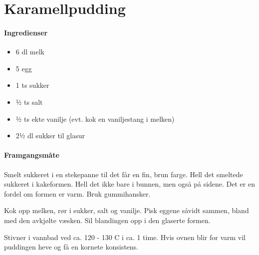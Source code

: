 \section{Karamellpudding}

\paragraph{Ingredienser}
\begin{itemize}[noitemsep]
	\item 6 dl melk
	\item 5 egg
	\item 1 ts sukker
	\item ½ ts salt
	\item ½ ts ekte vanilje (evt. kok en vaniljestang i melken)
	\item 2½ dl sukker til glasur
\end{itemize}

\paragraph{Framgangsmåte}
Smelt sukkeret i en stekepanne til det får en fin, brun farge. Hell det smeltede sukkeret i kakeformen. Hell det ikke bare i bunnen, men også på sidene. Det er en fordel om formen er varm. Bruk gummihansker.

Kok opp melken, rør i sukker, salt og vanilje. Pisk eggene såvidt sammen, bland med den avkjølte væsken. Sil blandingen opp i den glaserte formen.

Stivner i vannbad ved ca. 120 - 130 \textdegree{}C i ca. 1 time.
Hvis ovnen blir for varm vil puddingen heve og få en kornete konsistens.